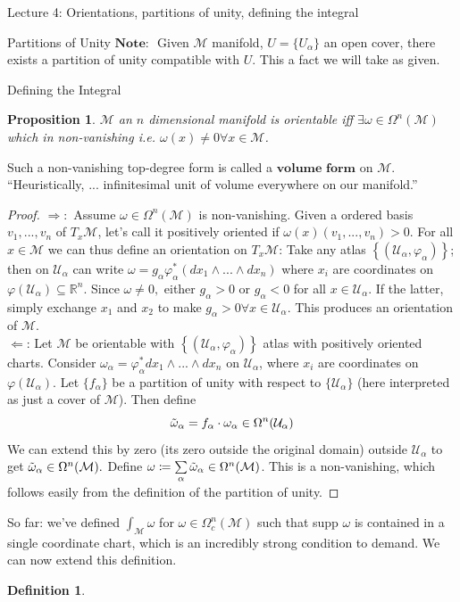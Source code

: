 \documentclass[10pt]{article}
\theoremstyle{plain}
\newtheorem{prop}[thm]{Proposition}
\theoremstyle{definition}
\newtheorem{defn}[thm]{Definition} %
\newcommand{\Note}{\textbf{Note: }}
\newcommand{\Real}{\mathbb{R}}
\newcommand{\man}{\mathcal{M}}
\newcommand{\chartU}{\mathcal{U}}
\newcommand{\chart}{\varphi}
\newcommand{\alphaatlas}{\left\{(\chartU_\alpha,\chart_\alpha)\right\}}
\newcommand{\xman}{x\in\man}
\newcommand{\allthevs}[2]{v_{#1},...,v_{#2}}
\newcommand{\allthewedge}[3]{{#1}_{#2}\wedge...\wedge{#1}_{#3}}
\newcommand{\tang}{T_x\man}
\newcommand{\pformman}[1]{\Omega^{#1}(\man)}
\newcommand{\compactpformman}[1]{\Omega^{#1}_c(\man)}
\newcommand{\dx}{dx}
\newcommand{\sumfromto}[2]{\sum\limits_{#1}^{#2}}
\begin{document}
\begin{section}{Lecture 4: Orientations, partitions of unity, defining the integral}
\begin{subsection}{Partitions of Unity}
  $\Note$ Given $\man$ manifold, $U = \{U_\alpha\}$ an open cover, there exists a partition of unity compatible with $U$. This a fact we will take as given.
 \end{subsection}
\begin{subsection}{Defining the Integral}
\begin{prop}
$\man$ an $n$ dimensional manifold is orientable iff $\exists \omega \in\pformman{n}$ which in non-vanishing i.e. $\omega(x) \neq 0 \forall \xman$. 
\end{prop}\noindent
Such a non-vanishing top-degree form is called a $\textbf{volume form}$ on $\man$. ``Heuristically, ... infinitesimal unit of volume everywhere on our manifold.''
\begin{proof}
$\Rightarrow:$ Assume $\omega\in\pformman{n}$ is non-vanishing. Given a ordered basis $\allthevs{1}{n}$ of $\tang$, let's call it positively oriented if $\omega(x)(\allthevs{1}{n})>0.$ For all $\xman$ we can thus define an orientation on $\tang$: Take any atlas $\alphaatlas$; then on $\chartU_\alpha$ can write $\omega = g_\alpha \chart^*_\alpha ( \allthewedge{\dx}{1}{n})$ where $x_i$ are coordinates on $\chart(\chartU_\alpha)\subseteq \Real^n.$ Since $\omega \neq 0,$ either $g_\alpha > 0$ or $g_\alpha <0$ for all $x \in \chartU _\alpha$. If the latter, simply exchange $x_1$ and $x_2$ to make $g_\alpha>0 \forall x\in\chartU_\alpha$. This produces an orientation of $\man$.\\
$\Leftarrow$: Let $\man$ be orientable with $\alphaatlas$ atlas with positively oriented charts. Consider $\omega_\alpha = \chart^*_\alpha \allthewedge{\dx}{1}{n}$ on $\chartU_\alpha$, where $x_i$ are coordinates on $\chart(\chartU_\alpha).$ Let $\{f_\alpha\}$ be a partition of unity with respect to $\{\chartU_\alpha\}$ (here interpreted as just a cover of $\man$). Then define $$\Tilde{\omega}_\alpha = f_\alpha \cdot \omega_\alpha \in \Omega^n(\chartU_\alpha)$$ We can extend this by zero (its zero outside the original domain) outside $\chartU_\alpha$ to get $\Tilde{\omega}_\alpha \in \pformman{n}.$ Define $\omega \coloneqq \sumfromto{\alpha}{} \Tilde{\omega}_\alpha\in\pformman{n}$. This is a non-vanishing, which follows easily from the definition of the partition of unity.
\end{proof}\noindent
So far: we've defined $\int_\man \omega$ for $\omega \in \compactpformman{n}$ such that supp $\omega$ is contained in a single coordinate chart, which is an incredibly strong condition to demand. We can now extend this definition.
\begin{defn}

\end{defn}
\end{subsection}
\end{section}
\end{document}

